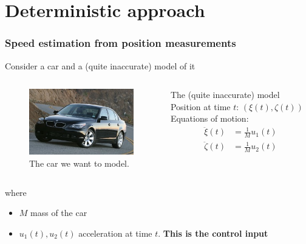 \section{Deterministic approach}
\begin{frame} 
	\frametitle{Speed estimation from position measurements} 
	Consider a car and a (quite inaccurate) model of it
	\begin{columns}[onlytextwidth,t]
		\begin{figure}[h]
			\includegraphics[width=\textwidth]{fig/auto_real}%
			\caption*{The car we want to model.\footnotemark} 
		\end{figure}
		\begin{block}{The (quite inaccurate) model}
		Position at time $t$: $(\xi(t), \zeta(t))$ \\%
		Equations of motion:
		\begin{align*}
		  \ddot{\xi}(t)& = \frac{1}{M} u_1(t) \\
		  \ddot{\zeta}(t)& = \frac{1}{M} u_2(t)
		\end{align*}
		\end{block}
	\end{columns}
	
	where 
	\begin{itemize}
		\item $M$ mass of the car\\
		\item $u_1(t), u_2(t)$ acceleration at time $t$. \textbf{This is the control input}\\
        \phantom{x}
	\end{itemize}
\end{frame}

